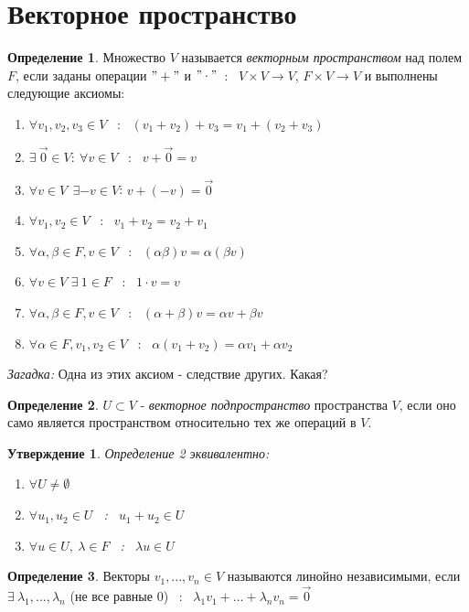 \documentclass[a4paper, 12pt]{article}
\theoremstyle{definition}
\newtheorem{definition}{Определение}
\theoremstyle{plain}
\newtheorem*{subtheorem}{Утверждение}
\theoremstyle{remark}
\begin{document}
  \section{Векторное пространство}
  \begin{definition}
    Множество $V$ называется \textit{векторным пространством} над полем $F$, если заданы операции $"+"$ и $"\cdot"$\ : \ $V\times V \to V$, $F \times V \to V$ и выполнены следующие аксиомы:
    \begin{enumerate}
        \item $\forall v_1, v_2, v_3\in V$ \ : \ $(v_1 + v_2) + v_3 = v_1 + (v_2 + v_3)$
        \item $\exists \ \vec 0 \in V:\ \forall v \in V$ \ : \ $v + \vec 0 = v$
        \item $\forall v \in V \ \ \exists  -v  \in V$: $v + (-v) = \vec 0$
        \item $\forall v_1, v_2 \in V$ \ : \ $v_1 + v_2 = v_2 + v_1$
        \item $\forall \alpha, \beta \in F, v \in V$ \ : \ $(\alpha \beta)v = \alpha (\beta v)$
        \item $\forall v \in V$ $\exists \ 1 \in F$ \ : \ $1 \cdot v = v$
        \item $\forall \alpha, \beta \in F, v \in V$ \ : \ $(\alpha + \beta)v = \alpha v + \beta v$
        \item $\forall \alpha \in F, v_1, v_2 \in V$ \ : \ $\alpha (v_1 + v_2) = \alpha v_1 + \alpha v_2$
    \end{enumerate}
    \textit{Загадка:} Одна из этих аксиом - следствие других. Какая?
  \end{definition}
  \begin{definition}
    $U \subset  V$ - \textit{векторное подпространство} пространства $V$, если оно само является пространством относительно тех же операций в $V$. 
  \end{definition}
  \begin{subtheorem}
    Определение 2 эквивалентно:
    \begin{enumerate}
      \item $\forall U\neq \emptyset $
      \item $\forall u_1, u_2 \in U$ \ : \  $u_1 + u_2 \in U$
      \item $\forall u \in U, \ \lambda \in F$ \ : \ $\lambda u\in U$
    \end{enumerate}
  \end{subtheorem} 
  \begin{definition}
    Векторы $v_1,...,v_n \in V$ называются линойно независимыми, если $\exists \ \lambda_1,..., \lambda_n$ (не все равные 0) \ : \ $\lambda_1v_1+...+\lambda_nv_n = \vec 0$
  \end{definition} 
\end{document}
